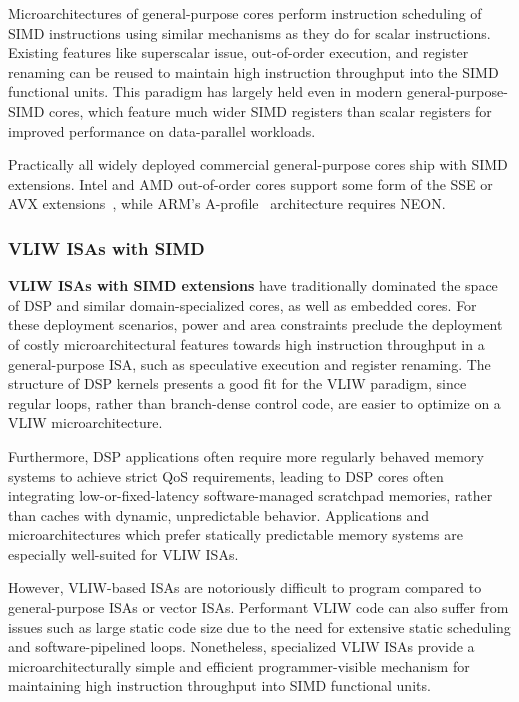 Microarchitectures of general-purpose cores perform instruction scheduling of SIMD instructions using similar mechanisms as they do for scalar instructions.
Existing features like superscalar issue, out-of-order execution, and register renaming can be reused to maintain high instruction throughput into the SIMD functional units.
This paradigm has largely held even in modern general-purpose-SIMD cores, which feature much wider SIMD registers than scalar registers for improved performance on data-parallel workloads.

Practically all widely deployed commercial general-purpose cores ship with SIMD extensions.
Intel and AMD out-of-order cores support some form of the SSE or AVX extensions~\cite{intel_avx}, while ARM's A-profile~\cite{armv8a} architecture requires NEON.
 
\subsubsection{VLIW ISAs with SIMD}

\textbf{VLIW ISAs with SIMD extensions} have traditionally dominated the space of DSP and similar domain-specialized cores, as well as embedded cores.
For these deployment scenarios, power and area constraints preclude the deployment of costly microarchitectural features towards high instruction throughput in a general-purpose ISA, such as speculative execution and register renaming.
The structure of DSP kernels presents a good fit for the VLIW paradigm, since regular loops, rather than branch-dense control code, are easier to optimize on a VLIW microarchitecture.

Furthermore, DSP applications often require more regularly behaved memory systems to achieve strict QoS requirements, leading to DSP cores often integrating low-or-fixed-latency software-managed scratchpad memories, rather than caches with dynamic, unpredictable behavior.
Applications and microarchitectures which prefer statically predictable memory systems are especially well-suited for VLIW ISAs.

However, VLIW-based ISAs are notoriously difficult to program compared to general-purpose ISAs or vector ISAs.
Performant VLIW code can also suffer from issues such as large static code size due to the need for extensive static scheduling and software-pipelined loops.
Nonetheless, specialized VLIW ISAs provide a microarchitecturally simple and efficient programmer-visible mechanism for maintaining high instruction throughput into SIMD functional units.

